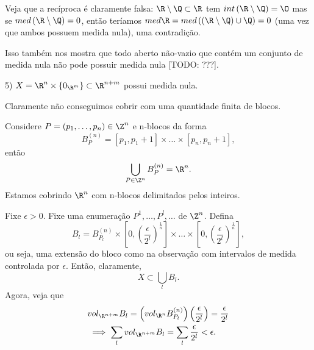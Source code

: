 \begin{note}
    Veja que a recíproca é claramente falsa:
    $\R \setminus \Q\subset \R$ tem $int\left( \R\setminus \Q \right) =\O$ mas se $med\left( \R \setminus \Q \right) = 0$, então teríamos $med \R = med\left( \left( \R \setminus \Q \right) \cup \Q \right) = 0$ (uma vez que ambos possuem medida nula), uma contradição.

    Isso também nos mostra que todo aberto não-vazio que contém um conjunto de medida nula não pode possuir medida nula [TODO: ???].
\end{note}

\begin{eg}
    5) $X =  \R^{n} \times \left\{ 0_{\R^{m}} \right\} \subset \R^{n+m}$ possui medida nula.

    Claramente não conseguimos cobrir com uma quantidade finita de blocos.

    \begin{remark}
	Considere $P = (p_1,\ldots,p_n) \in \Z^{n}$ e n-blocos da forma \[
        B_P^{(n)} = \left[ p_1, p_1+1 \right] \times \ldots\times \left[ p_n, p_n+1 \right] 
        ,\] então \[
        \bigcup_{P\in \Z^{n}}B_P^{(n)} = \R^{n}
        .\] Estamos cobrindo $\R^{n}$ com n-blocos delimitados pelos inteiros.
    \end{remark}

    Fixe $\epsilon>0$. Fixe uma enumeração $P^{1},\ldots,P^{l},\ldots$ de $\Z^{n}$. Defina \[
    B_l = B^{(n)}_{P_l} \times \left[ 0, \left( \frac{\epsilon}{2^{l}} \right)^{\frac{1}{n}} \right]\times \ldots\times \left[ 0, \left( \frac{\epsilon}{2^{l}} \right)^{\frac{1}{n}} \right]
    ,\] ou seja, uma extensão do bloco como na observação com intervalos de medida controlada por $\epsilon$. Então, claramente, \[
    X \subset  \bigcup _l B_l
    .\] Agora, veja que 
    \begin{align*}
	& vol_{\R^{n+m}}B_l = \left(  vol_{\R^{n}} B_{P_l}^{(n)}\right)  \left( \frac{\epsilon}{2^{l}} \right) = \frac{\epsilon}{2^{l}} \\
	& \implies \sum_{l} vol_{\R^{n+m}}B_l = \sum_{l} \frac{\epsilon}{2^{l}} < \epsilon
    .\end{align*}
\end{eg}

